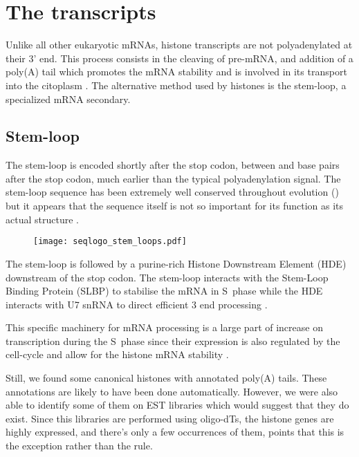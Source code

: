 \section{The transcripts}
  Unlike all other eukaryotic mRNAs, histone transcripts are not polyadenylated at
  their 3' end. This process consists in the cleaving of pre-mRNA, and addition of a
  poly(A) tail which promotes the mRNA stability and is involved in its transport
  into the citoplasm \citep{mRNA-end-processing}. The alternative method used by
  histones is the stem-loop, a specialized mRNA secondary.

  \subsection{Stem-loop}
    The stem-loop is encoded shortly after the stop codon, between \StemLoopStart{} and
    \StemLoopEnd{} base pairs after the stop codon, much earlier than the typical
    polyadenylation signal. The stem-loop sequence has been extremely well conserved
    throughout evolution () but it appears that the
    sequence itself is not so important for its function as its actual structure
    \citep{stem-loop-structure}.

    \begin{figure}
      \centering
      \texttt{[image: seqlogo\_stem\_loops.pdf]}
      \label{fig:stem-loop-seqlogo}
    \end{figure}

    The stem-loop is followed by a purine-rich Histone Downstream Element (HDE)
    downstream of the stop codon. The stem-loop interacts with the Stem-Loop
    Binding Protein (SLBP) to stabilise the mRNA in S~phase \citep{SLBP-regulation}
    while the HDE interacts with U7 snRNA to direct efficient 3 end processing
    \citep{HDE-sequence}.


    This specific machinery for mRNA processing is a large part of increase on
    transcription during the S~phase since their expression is also regulated
    by the cell-cycle \addref and allow for the histone mRNA stability \addref.

    Still, we found some canonical histones with annotated poly(A) tails. These annotations
    are likely to have been done automatically. However, we were also able to identify
    some of them on EST libraries which would suggest that they do exist. Since
    this libraries are performed using oligo-dTs, the histone genes are highly
    expressed, and there's only a few occurrences of them, points that this is
    the exception rather than the rule.

